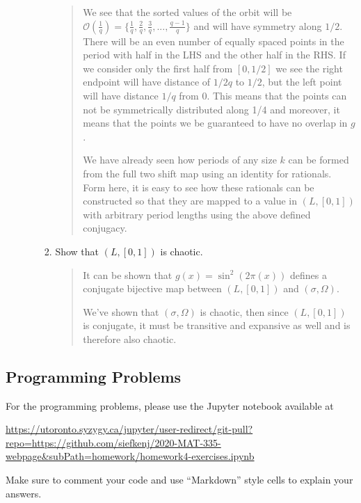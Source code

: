 \documentclass[letter]{article}
\begin{document}
\begin{enumerate}
\begin{enumerate}
\begin{enumerate}
\begin{quote}
				        We see that the sorted values of the orbit will be $\mathcal O(\frac{1}{q}) = \{ \frac{1}{q}, \frac{2}{q}, \frac{3}{q}, ..., \frac{q-1}{q}\}$ and will have symmetry along $1/2$. There will be an even number of equally spaced points in the period with half in the LHS and the other half in the RHS. If we consider only the first half from $[0, 1/2]$ we see the right endpoint will have distance of $1/2q$ to $1/2$, but the left point will have distance $1/q$ from $0$. This means that the points can not be symmetrically distributed along 1/4 and moreover, it means that the points we be guaranteed to have no overlap in $g$.

				        We have already seen how periods of any size $k$ can be formed from the full two shift map using an identity for rationals. Form here, it is easy to see how these rationals can be constructed so that they are mapped to a value in $(L,[0,1])$ with arbitrary period lengths using the above defined conjugacy.
					\end{quote}
					\item Show that $(L,[0,1])$ is chaotic.
					    \begin{quote}
					        It can be shown that $g(x)= \sin ^{2}(2\pi(x))$ defines a conjugate bijective map between $(L,[0,1])$ and $(\sigma,\Omega)$. 
					        
					        We've shown that $(\sigma,\Omega)$ is chaotic, then since $(L,[0,1])$ is conjugate, it must be transitive and expansive as well and is therefore also chaotic.
					    \end{quote}
					
				\end{enumerate}
		\end{enumerate}

	\end{enumerate}

    \newpage
    \subsection*{Programming Problems}
	For the programming problems, please use the Jupyter notebook available at

	\url{https://utoronto.syzygy.ca/jupyter/user-redirect/git-pull?repo=https://github.com/siefkenj/2020-MAT-335-webpage&subPath=homework/homework4-exercises.ipynb}

	Make sure to comment your code and use ``Markdown'' style cells to explain your answers.
\end{document}
